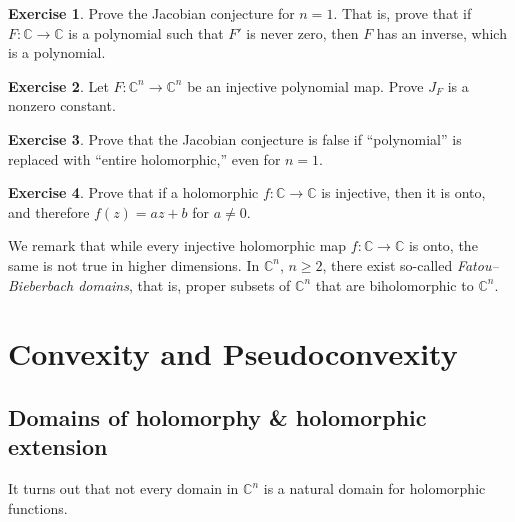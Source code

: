 \documentclass[12pt,openany]{book}
\newcommand{\C}{{\mathbb{C}}}
\theoremstyle{plain}
\theoremstyle{remark}
\theoremstyle{definition}
\newenvironment{exbox}{%
    \def\FrameCommand{\vrule width 1pt \relax\hspace{10pt}}%
    \MakeFramed{\advance\hsize-\width\FrameRestore}%
}{%
    \endMakeFramed
}
\theoremstyle{exercise}
\newtheorem{exercise}{Exercise}[section]
\theoremstyle{example}
\begin{document}
\begin{exbox}
\begin{exercise}
Prove the Jacobian conjecture for $n=1$.  That is, prove that if
$F \colon \C \to \C$ is a polynomial such that $F'$ is never zero,
then $F$ has an inverse, which is a polynomial.
\end{exercise}

\begin{exercise}
Let $F \colon \C^n \to \C^n$ be an injective polynomial map.
Prove $J_F$ is a nonzero constant.
\end{exercise}

\begin{exercise}
Prove that the Jacobian conjecture is false if
``polynomial'' is replaced with ``entire holomorphic,'' even for $n=1$.
\end{exercise}

\begin{exercise}
Prove that if a holomorphic $f \colon \C \to \C$ is injective, then it is
onto, and therefore $f(z) = az + b$ for $a \neq 0$.
\end{exercise}
\end{exbox}

We remark that while every injective holomorphic
map $f \colon \C \to \C$ is onto, the same is not true in higher
dimensions.
In $\C^n$, $n \geq 2$, there exist so-called
\emph{Fatou--Bieberbach domains},
that is, proper subsets of $\C^n$ that are biholomorphic to $\C^n$.



\chapter{Convexity and Pseudoconvexity} \label{ch:convexity}


\section{Domains of holomorphy \& holomorphic extension}

It turns out that not every domain in $\C^n$ is a natural domain for
holomorphic functions.
\end{document}
